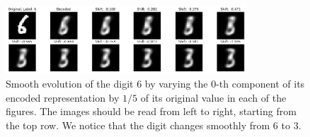 \begin{figure}[h]
    \centering
    \includegraphics[width=0.8\textwidth]{Images/shift6-3.png}
    \caption{Smooth evolution of the digit $6$ by varying the $0$-th component of its encoded representation by $1/5$ of its original value in each 
        of the figures. The images should be read from left to right, starting from the top row. We notice that the digit changes smoothly from $6$
        to $3$.}
    \label{fig:smooth}
\end{figure}